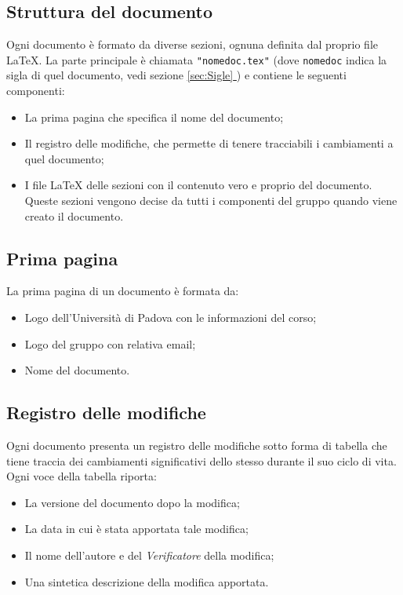 \subsection{Struttura del documento}
Ogni documento è formato da diverse sezioni, ognuna definita dal proprio file \LaTeX{}. La parte principale è chiamata \texttt{"nomedoc.tex"} (dove \texttt{nomedoc} indica la sigla di quel documento, vedi sezione \underline{\ref{sec:Sigle} }) e contiene le seguenti componenti:
\begin{itemize}
    \item La prima pagina che specifica il nome del documento;
    \item Il registro delle modifiche, che permette di tenere tracciabili i cambiamenti a quel documento;
    \item I file \LaTeX{} delle sezioni con il contenuto vero e proprio del documento. Queste sezioni vengono decise da tutti i componenti del gruppo quando viene creato il documento.
\end{itemize}
\subsection{Prima pagina}
La prima pagina di un documento è formata da:
\begin{itemize}
    \item Logo dell'Università di Padova con le informazioni del corso;
    \item Logo del gruppo con relativa email;
    \item Nome del documento.
\end{itemize}
\subsection{Registro delle modifiche}
Ogni documento presenta un registro delle modifiche sotto forma di tabella che tiene traccia dei cambiamenti significativi dello stesso durante il suo ciclo di vita. Ogni voce della tabella riporta:
\begin{itemize}
    \item La versione del documento dopo la modifica;
    \item La data in cui è stata apportata tale modifica;
    \item Il nome dell'autore e del \textit{Verificatore} della modifica;
    \item Una sintetica descrizione della modifica apportata.
\end{itemize}
